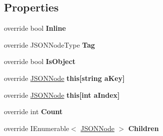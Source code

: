 \subsection*{Properties}
\begin{DoxyCompactItemize}
\item 
override bool {\bfseries Inline}\hypertarget{classSimpleJSON_1_1JSONObject_adfff304857552de0caee82f7c8b6d4ba}{}\label{classSimpleJSON_1_1JSONObject_adfff304857552de0caee82f7c8b6d4ba}

\item 
override J\+S\+O\+N\+Node\+Type {\bfseries Tag}\hypertarget{classSimpleJSON_1_1JSONObject_a59b4a19482d16ed77daa6091f6d2babe}{}\label{classSimpleJSON_1_1JSONObject_a59b4a19482d16ed77daa6091f6d2babe}

\item 
override bool {\bfseries Is\+Object}\hypertarget{classSimpleJSON_1_1JSONObject_a8fb6746d254d692a0a7347bbb2ca60be}{}\label{classSimpleJSON_1_1JSONObject_a8fb6746d254d692a0a7347bbb2ca60be}

\item 
override \hyperlink{classSimpleJSON_1_1JSONNode}{J\+S\+O\+N\+Node} {\bfseries this\mbox{[}string a\+Key\mbox{]}}\hypertarget{classSimpleJSON_1_1JSONObject_a033f4b4f82b4b5c1472d5c5a93d837d0}{}\label{classSimpleJSON_1_1JSONObject_a033f4b4f82b4b5c1472d5c5a93d837d0}

\item 
override \hyperlink{classSimpleJSON_1_1JSONNode}{J\+S\+O\+N\+Node} {\bfseries this\mbox{[}int a\+Index\mbox{]}}\hypertarget{classSimpleJSON_1_1JSONObject_a38d8506d39a74b169b4910a7126bd079}{}\label{classSimpleJSON_1_1JSONObject_a38d8506d39a74b169b4910a7126bd079}

\item 
override int {\bfseries Count}\hypertarget{classSimpleJSON_1_1JSONObject_ac7f6396a37f83d4085b8378633368e3d}{}\label{classSimpleJSON_1_1JSONObject_ac7f6396a37f83d4085b8378633368e3d}

\item 
override I\+Enumerable$<$ \hyperlink{classSimpleJSON_1_1JSONNode}{J\+S\+O\+N\+Node} $>$ {\bfseries Children}\hypertarget{classSimpleJSON_1_1JSONObject_aa82c4a84a03361ce8d7bb0b201d8ed3d}{}\label{classSimpleJSON_1_1JSONObject_aa82c4a84a03361ce8d7bb0b201d8ed3d}

\end{DoxyCompactItemize}

